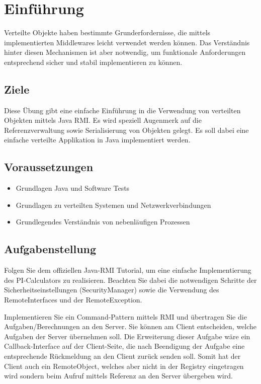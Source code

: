 
\section{Einführung}
Verteilte Objekte haben bestimmte Grunderfordernisse, die mittels implementierten Middlewares leicht verwendet werden können. Das Verständnis hinter diesen Mechanismen ist aber notwendig, um funktionale Anforderungen entsprechend sicher und stabil implementieren zu können.

\subsection{Ziele}
Diese Übung gibt eine einfache Einführung in die Verwendung von verteilten Objekten mittels Java RMI. Es wird speziell Augenmerk auf die Referenzverwaltung sowie Serialisierung von Objekten gelegt. Es soll dabei eine einfache verteilte Applikation in Java implementiert werden.

\subsection{Voraussetzungen}
\begin{itemize}
    \item Grundlagen Java und Software Tests
    \item Grundlagen zu verteilten Systemen und Netzwerkverbindungen
    \item Grundlegendes Verst\"andnis von nebenl\"aufigen Prozessen
\end{itemize}

\subsection{Aufgabenstellung}
Folgen Sie dem offiziellen Java-RMI Tutorial, um eine einfache Implementierung des PI-Calculators zu realisieren. Beachten Sie dabei die notwendigen Schritte der Sicherheitseinstellungen (SecurityManager) sowie die Verwendung des RemoteInterfaces und der RemoteException.

Implementieren Sie ein Command-Pattern mittels RMI und übertragen Sie die Aufgaben/Berechnungen an den Server. Sie können am Client entscheiden, welche Aufgaben der Server übernehmen soll. Die Erweiterung dieser Aufgabe wäre ein Callback-Interface auf der Client-Seite, die nach Beendigung der Aufgabe eine entsprechende Rückmeldung an den Client zurück senden soll. Somit hat der Client auch ein RemoteObject, welches aber nicht in der Registry eingetragen wird sondern beim Aufruf mittels Referenz an den Server übergeben wird.
\clearpage
